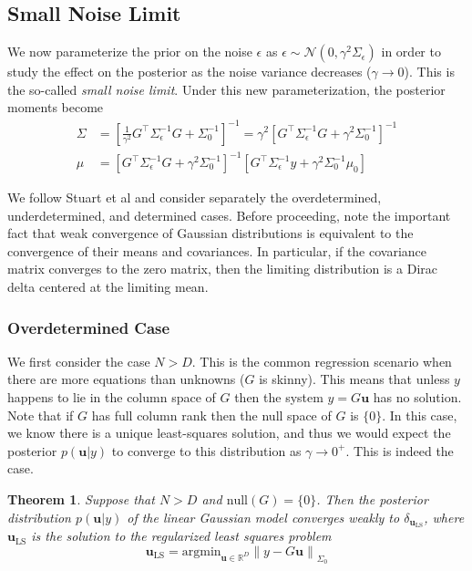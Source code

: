 \documentclass[12pt]{article}
\newcommand{\bpar}{\mathbf{u}} %
\newcommand*{\norm}[1]{\left\lVert#1\right\rVert}
\newcommand{\R}{\mathbb{R}}
\newtheorem{thm}{Theorem}
\begin{document}
\subsection{Small Noise Limit}
We now parameterize the prior on the noise $\epsilon$ as $\epsilon \sim \mathcal{N}(0, \gamma^2 \Sigma_\epsilon)$ in order to study the effect on the posterior as the noise variance 
decreases ($\gamma \to 0$). This is the so-called \textit{small noise limit}. Under this new parameterization, the posterior moments become 
\begin{align*}
\Sigma &=  \left[\frac{1}{\gamma^2} G^{\top} \Sigma_{\epsilon}^{-1} G + \Sigma_0^{-1} \right]^{-1}  = \gamma^2 \left[G^{\top} \Sigma_{\epsilon}^{-1} G + \gamma^2 \Sigma_0^{-1} \right]^{-1} \\
\mu &= \left[G^{\top} \Sigma_{\epsilon}^{-1} G + \gamma^2 \Sigma_0^{-1} \right]^{-1}  \left[G^{\top} \Sigma_{\epsilon}^{-1}y + \gamma^2 \Sigma_0^{-1} \mu_0 \right]
\end{align*}

We follow Stuart et al and consider separately the overdetermined, underdetermined, and determined cases. Before proceeding, note the important fact that 
weak convergence of Gaussian distributions is equivalent to the convergence of their means and covariances. In particular, if the covariance matrix converges 
to the zero matrix, then the limiting distribution is a Dirac delta centered at the limiting mean. 

\subsubsection{Overdetermined Case}
We first consider the case $N > D$. This is the common regression scenario when there are more equations than unknowns ($G$ is skinny). This means that unless $y$ happens 
to lie in the column space of $G$ then the system $y = G\bpar$ has no solution. Note that if $G$ has full column rank then the null space of $G$ is $\{0\}$. In this case,
we know there is a unique least-squares solution, and thus we would expect the posterior $p(\bpar|y)$ to converge to this distribution as $\gamma \to 0^+$. This is indeed the case. 

\begin{thm}
Suppose that $N > D$ and $\text{null}(G) = \{0\}$. Then the posterior distribution $p(\bpar|y)$ of the linear Gaussian model converges weakly to $\delta_{\bpar_{\text{LS}}}$, where 
$\bpar_{\text{LS}}$ is the solution to the regularized least squares problem
\[\bpar_{\text{LS}} = \text{argmin}_{\bpar \in \R^D} \norm{y - G\bpar}_{\Sigma_0} \]
\end{thm}
\end{document}
